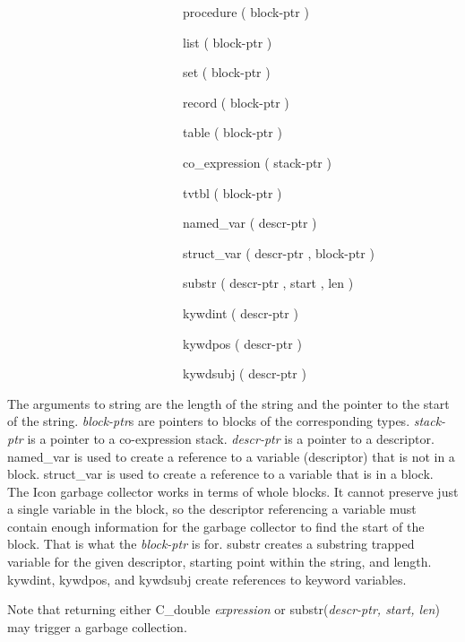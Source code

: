 {\ttfamily\mdseries
\ \ \ \ \ \ \ \ \ \ \ \ \ \ \ \ \ \ \ \ \ \ \ \ \ \ \ \ procedure ( block-ptr ) {\textbar}}

{\ttfamily\mdseries
\ \ \ \ \ \ \ \ \ \ \ \ \ \ \ \ \ \ \ \ \ \ \ \ \ \ \ \ list ( block-ptr ) {\textbar}}

{\ttfamily\mdseries
\ \ \ \ \ \ \ \ \ \ \ \ \ \ \ \ \ \ \ \ \ \ \ \ \ \ \ \ set ( block-ptr ) {\textbar}}

{\ttfamily\mdseries
\ \ \ \ \ \ \ \ \ \ \ \ \ \ \ \ \ \ \ \ \ \ \ \ \ \ \ \ record ( block-ptr ) {\textbar}}

{\ttfamily\mdseries
\ \ \ \ \ \ \ \ \ \ \ \ \ \ \ \ \ \ \ \ \ \ \ \ \ \ \ \ table ( block-ptr ) {\textbar}}

{\ttfamily\mdseries
\ \ \ \ \ \ \ \ \ \ \ \ \ \ \ \ \ \ \ \ \ \ \ \ \ \ \ \ co\_expression ( stack-ptr ) {\textbar}}

{\ttfamily\mdseries
\ \ \ \ \ \ \ \ \ \ \ \ \ \ \ \ \ \ \ \ \ \ \ \ \ \ \ \ tvtbl ( block-ptr ) {\textbar}}

{\ttfamily\mdseries
\ \ \ \ \ \ \ \ \ \ \ \ \ \ \ \ \ \ \ \ \ \ \ \ \ \ \ \ named\_var ( descr-ptr ) {\textbar}}

{\ttfamily\mdseries
\ \ \ \ \ \ \ \ \ \ \ \ \ \ \ \ \ \ \ \ \ \ \ \ \ \ \ \ struct\_var ( descr-ptr , block-ptr ) {\textbar}}

{\ttfamily\mdseries
\ \ \ \ \ \ \ \ \ \ \ \ \ \ \ \ \ \ \ \ \ \ \ \ \ \ \ \ substr ( descr-ptr , start , len ) {\textbar}}

{\ttfamily\mdseries
\ \ \ \ \ \ \ \ \ \ \ \ \ \ \ \ \ \ \ \ \ \ \ \ \ \ \ \ kywdint ( descr-ptr ) {\textbar}}

{\ttfamily\mdseries
\ \ \ \ \ \ \ \ \ \ \ \ \ \ \ \ \ \ \ \ \ \ \ \ \ \ \ \ kywdpos ( descr-ptr ) {\textbar}}

{\ttfamily\mdseries
\ \ \ \ \ \ \ \ \ \ \ \ \ \ \ \ \ \ \ \ \ \ \ \ \ \ \ \ kywdsubj ( descr-ptr )}


The arguments to string are the length of the string and the pointer
to the start of the string. \textit{block-ptr}s are pointers to blocks
of the corresponding types. \textit{stack-ptr} is a pointer to a
co-expression stack.  \textit{descr-ptr} is a pointer to a
descriptor. named\_var is used to create a reference to a variable
(descriptor) that is not in a block. struct\_var is used to create a
reference to a variable that is in a block. The Icon garbage collector
works in terms of whole blocks. It cannot preserve just a single
variable in the block, so the descriptor referencing a variable must
contain enough information for the garbage collector to find the start
of the block. That is what the \textit{block-ptr} is for. substr
creates a substring trapped variable for the given descriptor,
starting point within the string, and length. kywdint, kywdpos, and
kywdsubj create references to keyword variables.

Note that returning either C\_double \textit{expression} or
substr(\textit{descr-ptr, start, len}) may trigger a garbage
collection. \newline


\bigskip


\bigskip


\bigskip
